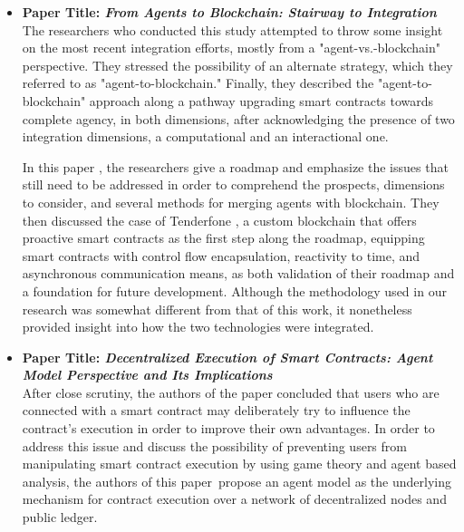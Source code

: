 \begin{itemize}[label={}]

\item \textbf{Paper Title: \textit{From Agents to Blockchain: Stairway to Integration}} \\

The researchers who conducted this study attempted to throw some insight on the most recent integration efforts, mostly from a "agent-vs.-blockchain" perspective. They stressed the possibility of an alternate strategy, which they referred to as "agent-to-blockchain." Finally, they described the "agent-to-blockchain" approach along a pathway upgrading smart contracts towards complete agency, in both dimensions, after acknowledging the presence of two integration dimensions, a computational and an interactional one.

\vspace{.5cm}

In this paper \cite{ag2bc}, the researchers give a roadmap and emphasize the issues that still need to be addressed in order to comprehend the prospects, dimensions to consider, and several methods for merging agents with blockchain. They then discussed the case of Tenderfone \cite{tenGlab}, a custom blockchain that offers proactive smart contracts as the first step along the roadmap, equipping smart contracts with control flow encapsulation, reactivity to time, and asynchronous communication means, as both validation of their roadmap and a foundation for future development. Although the methodology used in our research was somewhat different from that of this work, it nonetheless provided insight into how the two technologies were integrated.

\vspace{.5cm}

\item \textbf{Paper Title: \textit{Decentralized Execution of Smart Contracts: Agent Model Perspective and Its Implications}}\\

After close scrutiny, the authors of the paper \cite{decentralized} concluded that users who are connected with a smart contract may deliberately try to influence the contract's execution in order to improve their own advantages. In order to address this issue and discuss the possibility of preventing users from manipulating smart contract execution by using game theory and agent based analysis, the authors of this paper propose an agent model as the underlying mechanism for contract execution over a network of decentralized nodes and public ledger.


\end{itemize}
